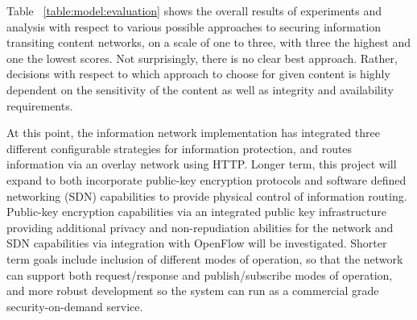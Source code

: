 Table ~\ref{table:model:evaluation} shows the overall results of experiments and analysis with respect to various possible approaches to securing information transiting content networks, on a scale of one to three, with three the highest and one the lowest scores.  Not surprisingly, there is no clear best approach.  Rather, decisions with respect to which approach to choose for given content is highly dependent on the sensitivity of the content as well as integrity and availability requirements.
	
At this point, the information network implementation has integrated three different configurable strategies for information protection, and routes information via an overlay network using HTTP.  Longer term, this project will expand to both incorporate public-key encryption protocols and software defined networking (SDN) capabilities to provide physical control of information routing.  Public-key encryption capabilities via an integrated public key infrastructure providing additional privacy and non-repudiation abilities for the network and SDN capabilities via integration with OpenFlow will be investigated.  Shorter term goals include inclusion of different modes of operation, so that the network can support both request/response and publish/subscribe modes of operation, and more robust development so the system can run as a commercial grade security-on-demand service.
